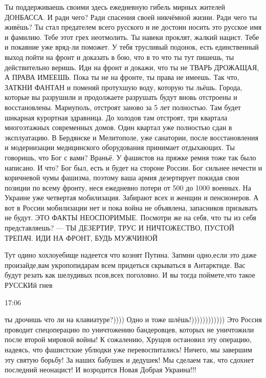 Ты поддерживаешь своими здесь ежедневную гибель мирных жителей ДОНБАССА.
И ради чего?
Ради спасения своей никчёмной жизни.
Ради чего ты живёшь?
Ты стал предателем всего русского и не достоин носить это русское имя и фамилию.
Тебе этот грех неотмолить.
Ты навеки проклят, жалкий нацист.
Тебе и покаяние уже вряд-ли поможет.
У тебя трусливый подонок, есть единственный выход пойти на фронт и доказать в бою, что в то что ты тут пишешь, ты действительно веришь.
Иди на фронт и докажи, что ты не ТВАРЬ ДРОЖАЩАЯ, А ПРАВА ИМЕЕШЬ.
Пока ты не на фронте, ты права не имеешь.
Так что, ЗАТКНИ ФАНТАН и поменяй протухшую воду, которую ты льёшь.
Города, которые вы разрушили и продолжаете разрушать будут вновь отстроены и восстановлены.
Мариуполь, отстроят заново за 5 лет полностью. Там будет шикарная курортная здравница. До холодов там отстроят, три квартала многоэтажных современных домов. Один квартал уже полностью сдан в эксплуатацию.
В Бердянске и Мелитополе, уже санатории, после восстановления и модернизации медицинского оборудования принимает отдыхающих.
Ты говоришь, что Бог с вами?
Враньё.
У фашистов на пряжке ремня тоже так было написано.
И что?
Бог был, есть и будет на стороне России.
Бог сильнее нечести и коричневой чумы фашизма, поэтому ваша армия дезертирует покидая свои позиции по всему фронту, неся ежедневно потери от 500 до 1000 военных.
На Украине уже четвертая мобилизация.
Забирают всех и женщин и пенсионеров.
А вот в России мобилизации нет и пока война не объявлена, запасников призывать не будут.
ЭТО ФАКТЫ НЕОСПОРИМЫЕ.
Посмотри же на себя, что ты из себя представляешь? —
ТЫ ДЕЗЕРТИР, ТРУС И НИЧТОЖЕСТВО, ПУСТОЙ ТРЕПАЧ.
ИДИ НА ФРОНТ, БУДЬ МУЖЧИНОЙ


Тут одино хохлоуебище надеется что кознят Путина. Запмни одно,если это даже
произайде,вам укропопидарам всем придеться скрываться в Антарктиде. Вас будут
резать как шелудивых псов,всех поголовно. И вы тогда поймете,что такое РУССКИй
гнев

17:06

ты дрочишь что ли на клавиатуре?)))) Одно и тоже шлёшь!)))))))))))) Это Россия
проводит спецоперацию по уничтожению бандеровцев, которых не уничтожили после
второй мировой войны! К сожалению, Хрущов остановил эту операцию, надеясь, что
фашистские ублюдки уже перевоспитались! Ничего, мы завершим эту святую борьбу!
За наших бабушек и дедушек! Мы сделаем так, что сдохнет последний неонацист! И
возродится Новая Добрая Украина!!!

